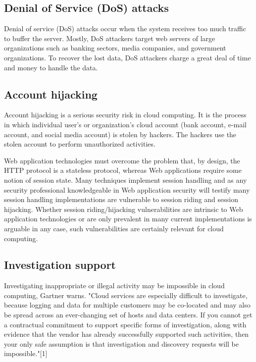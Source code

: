 \documentclass[conference]{IEEEtran}
\begin{document}
\subsection{Denial of Service (DoS) attacks}
Denial of service (DoS) attacks occur when the system receives too much traffic to buffer the server. Mostly, DoS attackers target web servers of large organizations such as banking sectors, media companies, and government organizations. To recover the lost data, DoS attackers charge a great deal of time and money to handle the data.

\subsection{Account hijacking}
Account hijacking is a serious security risk in cloud computing. It is the process in which individual user's or organization's cloud account (bank account, e-mail account, and social media account) is stolen by hackers. The hackers use the stolen account to perform unauthorized activities.

Web application technologies must overcome the problem that, by design, the HTTP protocol is a stateless protocol, whereas Web applications require some notion of session state. Many techniques implement session handling and as any security professional knowledgeable in Web application security
will testify many session handling implementations are vulnerable to session riding and session hijacking. Whether session riding/hijacking vulnerabilities are intrinsic to Web application technologies or are
only prevalent in many current implementations is arguable in any case, such vulnerabilities are certainly relevant for cloud computing.

\subsection{Investigation support}
Investigating inappropriate or illegal activity may be impossible in cloud computing, Gartner warns. "Cloud services are especially difficult to investigate, because logging and data for multiple customers may be co-located and may also be spread across an ever-changing set of hosts and data centers. If you cannot get a contractual commitment to support specific forms of investigation, along with evidence that the vendor has already successfully supported such activities, then your only safe assumption is that investigation and discovery requests will be impossible."[1]
\end{document}

